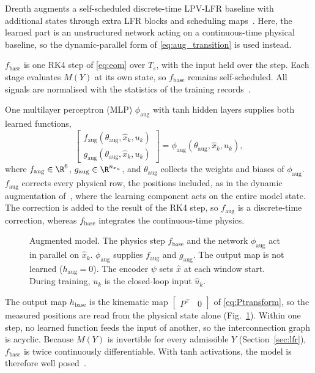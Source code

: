 Drenth augments a self-scheduled discrete-time LPV-LFR baseline with
additional states through extra LFR blocks and scheduling
maps~\cite[Sec.~5.2]{drenth2025thesis}.
Here, the learned part is an unstructured network acting on a
continuous-time physical baseline, so the dynamic-parallel form of
\eqref{eq:aug_transition} is used instead.

$f_{\mathrm{base}}$ is one RK4 step of \eqref{eq:eom} over $T_s$, with the
input held over the step.
Each stage evaluates $M(Y)$ at its own state, so $f_{\mathrm{base}}$ remains
self-scheduled.
All signals are normalised with the statistics of the training
records~\cite[Sec.~5.3]{hoekstra2026lfr}.

One multilayer perceptron (MLP) $\phi_{\mathrm{aug}}$ with tanh hidden layers
supplies both learned functions,
\begin{equation}
 \begin{bmatrix}
  f_{\mathrm{aug}}(\theta_{\mathrm{aug}},\hat x_k,u_k)\\
  g_{\mathrm{aug}}(\theta_{\mathrm{aug}},\hat x_k,u_k)
 \end{bmatrix}
 =\phi_{\mathrm{aug}}(\theta_{\mathrm{aug}},\hat x_k,u_k),
 \label{eq:aug_mlp}
\end{equation}
where $f_{\mathrm{aug}}\in\R^6$, $g_{\mathrm{aug}}\in\R^{n_{x_a}}$, and
$\theta_{\mathrm{aug}}$ collects the weights and biases of
$\phi_{\mathrm{aug}}$.
$f_{\mathrm{aug}}$ corrects every physical row, the positions included, as
in the dynamic augmentation of~\cite[Sec.~2]{hoekstra2025lfr}, where the
learning component acts on the entire model state.
The correction is added to the result of the RK4 step, so
$f_{\mathrm{aug}}$ is a discrete-time correction, whereas $f_{\mathrm{base}}$
integrates the continuous-time physics.

\begin{figure}[t]
 \centering
 \resizebox{\columnwidth}{!}{}
 \caption{Augmented model. The physics step $f_{\mathrm{base}}$ and the
 network $\phi_{\mathrm{aug}}$ act in parallel on $\hat x_k$.
 $\phi_{\mathrm{aug}}$ supplies $f_{\mathrm{aug}}$ and $g_{\mathrm{aug}}$.
 The output map is not learned ($h_{\mathrm{aug}}=0$). The encoder
 $\psi$ sets $\hat x$ at each window start. During training, $u_k$ is the
 closed-loop input $\hat u_k$.}
 \label{fig:aug_structure}
\end{figure}

The output map $h_{\mathrm{base}}$ is the kinematic map
$\begin{bmatrix}P^\top & 0\end{bmatrix}$ of \eqref{eq:Ptransform}, so the
measured positions are read from the physical state alone
(Fig.~\ref{fig:aug_structure}).
Within one step, no learned function feeds the input of another, so the
interconnection graph is acyclic.
Because $M(Y)$ is invertible for every admissible $Y$
(Section~\ref{sec:lfr}), $f_{\mathrm{base}}$ is twice continuously
differentiable.
With tanh activations, the model is therefore well
posed~\cite[Thm.~9]{hoekstra2026lfr}.


